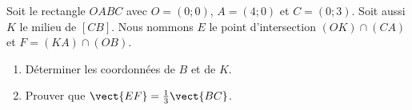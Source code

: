 
\begin{exercice}\label{exosmath-0156}

    Soit le rectangle \( OABC\) avec \( O=(0;0)\), \( A=(4;0)\) et \( C=(0;3)\). Soit aussi \( K\) le milieu de \( [CB]\). Nous nommons \( E\) le point d'intersection \( (OK)\cap (CA)\) et \( F=(KA)\cap(OB)\).
    \begin{enumerate}
        \item
            Déterminer les coordonnées de \( B\) et de \( K\).
        \item
            Prouver que \( \vect{ EF }=\frac{1}{ 3 }\vect{ BC }\).
    \end{enumerate}

\end{exercice}
